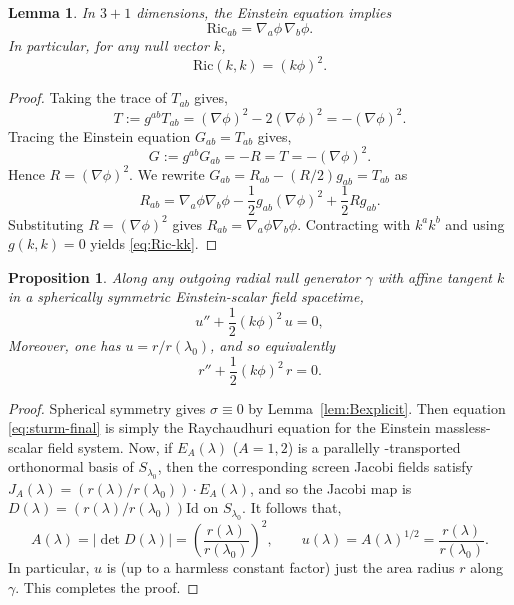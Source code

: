 \documentclass[a4paper, reqno]{amsart}
\numberwithin{equation}{section}
\theoremstyle{plain}
\newtheorem{proposition}[theorem]{Proposition}
\newtheorem{lemma}[theorem]{Lemma}
\theoremstyle{definition}
\theoremstyle{remark}
\begin{document}
\begin{lemma}\label{lem:ricci-scalar}
In $3+1$ dimensions, the Einstein equation implies \begin{equation}\label{eq:ricci=gradphi}
\mathrm{Ric}_{ab} = \nabla_a\phi\,\nabla_b\phi.
\end{equation}
In particular, for any null vector $k$,
\begin{equation}\label{eq:Ric-kk}
\mathrm{Ric}(k,k)=(k\phi)^2.
\end{equation}
\end{lemma}
\begin{proof}
Taking the trace of $T_{ab}$ gives,
$$
T:=g^{ab}T_{ab} = (\nabla\phi)^2 - 2(\nabla\phi)^2 = -(\nabla\phi)^2.
$$
Tracing the Einstein equation $G_{ab}=T_{ab}$ gives,
$$
G:=g^{ab}G_{ab}= -R =  T = -(\nabla\phi)^2.
$$
Hence $R=(\nabla\phi)^2$. We rewrite $G_{ab}=R_{ab}-(R/2)g_{ab}=T_{ab}$ as
$$
R_{ab} = \nabla_a\phi\nabla_b\phi - \frac12 g_{ab}(\nabla\phi)^2 + \frac12 R g_{ab}.
$$
Substituting $R=(\nabla\phi)^2$ gives $R_{ab} = \nabla_a\phi\nabla_b\phi.$ Contracting with $k^ak^b$ and using $g(k,k)=0$ yields \eqref{eq:Ric-kk}.

\end{proof}

\begin{proposition}\label{prop:sturm-scalar}
Along any outgoing radial null generator $\gamma$ with affine tangent $k$ in a spherically symmetric
Einstein-scalar field spacetime,
\begin{equation}\label{eq:sturm-final}
u'' + \frac{1}{2}(k\phi)^2\,u = 0,
\end{equation}
Moreover, one has $u=r/r(\lambda_0)$, and so equivalently
\begin{equation}\label{eq:r-ode}
r'' + \frac{1}{2}(k\phi)^2\,r = 0.
\end{equation}
\end{proposition}
\begin{proof}
Spherical symmetry gives $\sigma\equiv 0$ by Lemma~\ref{lem:Bexplicit}. Then equation \eqref{eq:sturm-final} is simply the Raychaudhuri equation for the Einstein massless-scalar field system. Now, if $E_A(\lambda)$ ($A=1,2$) is a parallelly -transported
orthonormal basis of $S_{\lambda_0}$, then the corresponding screen Jacobi fields satisfy
$J_A(\lambda) = (r(\lambda)/r(\lambda_0) )\cdot E_A(\lambda)$, and so the Jacobi map is $D(\lambda)=(r(\lambda)/r(\lambda_0))\mathrm{Id}$ on $S_{\lambda_0}$. It follows that,
$$
A(\lambda)=|\det D(\lambda)| = \left(\frac{r(\lambda)}{r(\lambda_0)}\right)^2,
\qquad
u(\lambda)=A(\lambda)^{1/2}=\frac{r(\lambda)}{r(\lambda_0)}.
$$
In particular, $u$ is (up to a harmless constant factor) just the area radius $r$ along $\gamma$. This completes the proof.

\end{proof}
\end{document}
